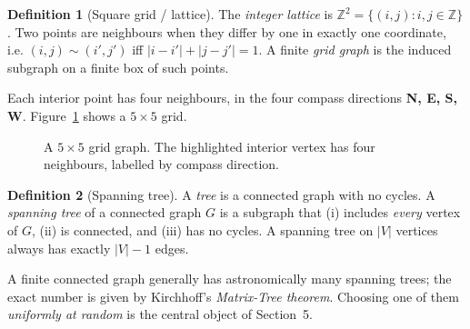 \documentclass[11pt]{article}
\theoremstyle{definition}
\newtheorem{definition}{Definition}[section]
\theoremstyle{plain}
\newcommand{\Z}{\mathbb{Z}}
\begin{document}
\begin{definition}[Square grid / lattice]
The \emph{integer lattice} is $\Z^2=\{(i,j): i,j\in\Z\}$. Two points are
neighbours when they differ by one in exactly one coordinate, i.e.
$(i,j)\sim(i',j')$ iff $|i-i'|+|j-j'|=1$. A finite \emph{grid graph} is the
induced subgraph on a finite box of such points.
\end{definition}

Each interior point has four neighbours, in the four compass directions
\textbf{N, E, S, W}. Figure~\ref{fig:grid} shows a $5\times5$ grid.

\begin{figure}[h]
\centering
{}
\caption{A $5\times5$ grid graph. The highlighted interior vertex has four
neighbours, labelled by compass direction.}
\label{fig:grid}
\end{figure}

\begin{definition}[Spanning tree]
A \emph{tree} is a connected graph with no cycles. A \emph{spanning tree} of a
connected graph $G$ is a subgraph that (i) includes \emph{every} vertex of $G$,
(ii) is connected, and (iii) has no cycles. A spanning tree on $|V|$ vertices
always has exactly $|V|-1$ edges.
\end{definition}

A finite connected graph generally has astronomically many spanning trees; the
exact number is given by Kirchhoff's \emph{Matrix-Tree theorem}. Choosing one
of them \emph{uniformly at random} is the central object of Section~5.
\end{document}
